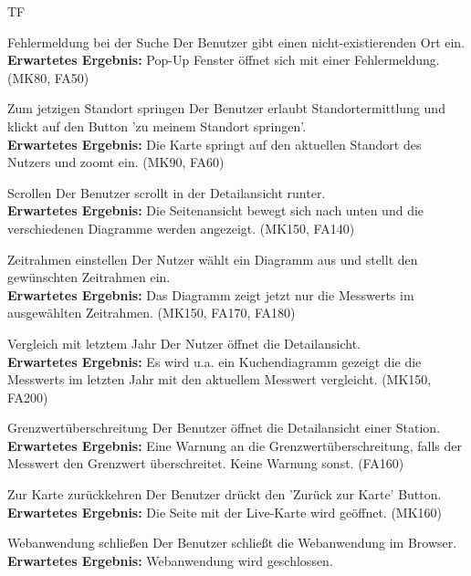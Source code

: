 \begin{Kriterien}{TF}
	\item[Fehlermeldung bei der Suche] Der Benutzer gibt einen nicht-existierenden Ort ein. \\ \textbf{Erwartetes Ergebnis:} Pop-Up Fenster öffnet sich mit einer Fehlermeldung. (MK80, FA50)
	
	\item[Zum jetzigen Standort springen] Der Benutzer erlaubt Standortermittlung und klickt auf den Button  'zu meinem Standort springen'. \\ \textbf{Erwartetes Ergebnis:} Die Karte springt auf den aktuellen Standort des Nutzers und zoomt ein. (MK90, FA60)
	
	\item[Scrollen] Der Benutzer scrollt in der Detailansicht runter. \\ \textbf{Erwartetes Ergebnis:} Die Seitenansicht bewegt sich nach unten und die verschiedenen Diagramme werden angezeigt. (MK150, FA140)
	
    
    \item[Zeitrahmen einstellen] Der Nutzer wählt ein Diagramm aus und stellt den gewünschten Zeitrahmen ein. \\ \textbf{Erwartetes Ergebnis:} Das Diagramm zeigt jetzt nur die \glspl{Messwert} im ausgewählten Zeitrahmen. (MK150, FA170, FA180)
    
    \item[Vergleich mit letztem Jahr] Der Nutzer öffnet die \gls{Detailansicht}. \\ \textbf{Erwartetes Ergebnis:} Es wird u.a. ein Kuchendiagramm gezeigt die die \glspl{Messwert} im letzten Jahr mit den aktuellem Messwert vergleicht. (MK150, FA200)
    
    \item[Grenzwertüberschreitung] Der Benutzer öffnet die \gls{Detailansicht} einer \gls{Station}. \\ \textbf{Erwartetes Ergebnis:} Eine Warnung an die Grenzwertüberschreitung, falls der \gls{Messwert} den Grenzwert überschreitet. Keine Warnung sonst. (FA160)
	
	\item[Zur Karte zurückkehren] Der Benutzer drückt den 'Zurück zur Karte' Button. \\ \textbf{Erwartetes Ergebnis:} Die Seite mit der \gls{Live-Karte} wird geöffnet. (MK160)
	
	\item[Webanwendung schließen] Der Benutzer schließt die Webanwendung im Browser. \\ \textbf{Erwartetes Ergebnis:} Webanwendung wird geschlossen.
\end{Kriterien}
